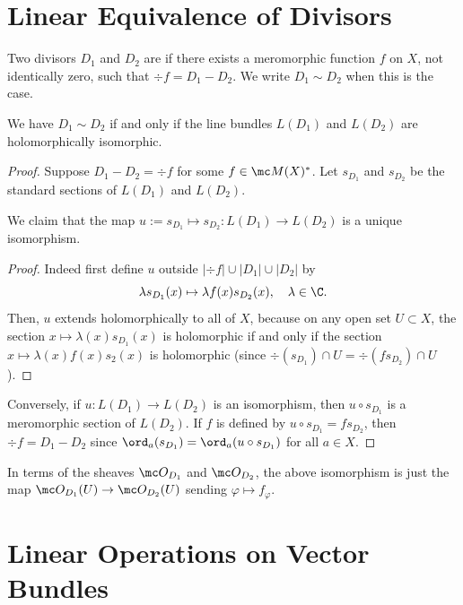 \documentclass[11pt]{report}
\begin{document}
\section{Linear Equivalence of Divisors}

\begin{defn}
    Two divisors $D_1$ and $D_2$ are  if there exists a meromorphic function $f$ on $X$, not identically zero, such that $\div f= D_1 - D_2$. We write $D_1 \sim D_2$ when this is the case. 
\end{defn}

\begin{prop}
    We have $D_1 \sim D_2$ if and only if the line bundles $L(D_1)$ and $L(D_2)$ are holomorphically isomorphic.
\end{prop}

\begin{proof}
    Suppose $D_1 -D_2 = \div f$ for some $f \in \mc M(X)^*$. Let $s_{D_1}$ and $s_{D_2}$ be the standard sections of $L(D_1)$ and $L(D_2)$. 
    \begin{claim}
        We claim that the map $u:=s_{D_1}\mapsto s_{D_2}:L(D_1)\to L(D_2)$ is a unique isomorphism.
    \end{claim}
    \begin{proof}
     Indeed first define $u$ outside $|\div f| \cup |D_1| \cup |D_2|$ by \[
    \lambda s_{D_1}(x) \mapsto \lambda f(x)s_{D_2}(x), \quad \lambda \in \C.
    \] 
    Then, $u$ extends holomorphically to all of $X$, because on any open set $U \subset X$, the section $x \mapsto \lambda (x)s_{D_1}(x)$ is holomorphic if and only if the section $x \mapsto \lambda (x)f(x)s_{2}(x)$ is holomorphic (since $\div(s_{D_1}) \cap U=\div (fs_{D_2})\cap U$).
    \end{proof}
    Conversely, if $u:L(D_1) \to L(D_2)$ is an isomorphism, then $u \circ s_{D_1}$ is a meromorphic section of $L(D_2)$. If $f$ is defined by $u \circ s_{D_1}=fs_{D_2}$, then $\div f = D_1 - D_2$ since $\ord_a(s_{D_1})=\ord_a(u \circ s_{D_1})$ for all $a \in X$.
\end{proof}

\begin{rmk}
    In terms of the sheaves $\mc O_{D_1}$ and $\mc O_{D_2}$, the above isomorphism is just the map $\mc O_{D_1}(U) \to \mc O_{D_2}(U)$ sending $\varphi \mapsto f _\varphi$.
\end{rmk}

\section{Linear Operations on Vector Bundles}
\end{document}
